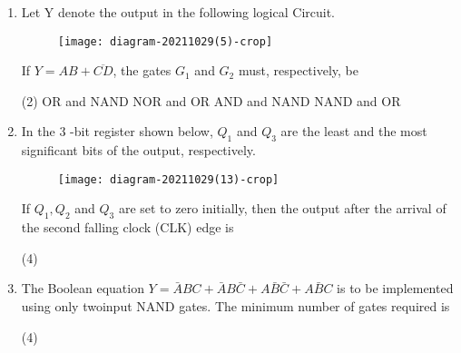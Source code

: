 \begin{enumerate}
\begin{align*}
\begin{tabular}{|p{1cm}|p{1cm}|p{1cm}|p{1cm}|}
	\hline
	\end{tabular}
	\end{align*}
	\item Let Y denote the output in the following logical Circuit.\\
	\begin{figure}[H]
		\centering	\texttt{[image: diagram-20211029(5)-crop]}
	\end{figure}
	If $Y=A B+\overline{C D}$, the gates $G_{1}$ and $G_{2}$ must, respectively, be
	{}
	\begin{tasks}(2)
		\task[\textbf{A.}] OR and NAND
		\task[\textbf{B.}] NOR and OR
		\task[\textbf{C.}] AND and NAND
		\task[\textbf{D.}] NAND and OR
	\end{tasks}
	\item In the 3 -bit register shown below, $Q_{1}$ and $Q_{3}$ are the least and the most significant bits of the output, respectively.\\
	\begin{figure}[H]
		\centering
		\texttt{[image: diagram-20211029(13)-crop]}
	\end{figure}
	If $Q_{1}, Q_{2}$ and $Q_{3}$ are set to zero initially, then the output after the arrival of the second falling clock (CLK) edge is
	{}
	\begin{tasks}(4)
	\end{tasks}
	\item The Boolean equation $Y=\bar{A} B C+\bar{A} B \bar{C}+A \bar{B} \bar{C}+A \bar{B} C$ is to be implemented using only twoinput NAND gates. The minimum number of gates required is
	{}
	\begin{tasks}(4)
	\end{tasks}
\end{enumerate}
\setlength\arrayrulewidth{1pt}
